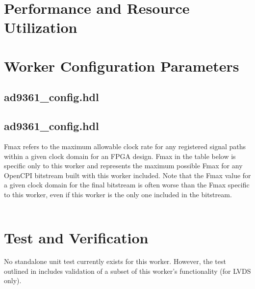 \documentclass{article}
\def\comp{ad9361\_config}
\edef\ecomp{ad9361_config}
\begin{document}
\begin{landscape}
\section{Performance and Resource Utilization}
\section{Worker Configuration Parameters}
\subsection{\comp.hdl}
%
\subsection{\comp.hdl}
Fmax refers to the maximum allowable clock rate for any registered signal paths within a given clock domain for an FPGA design. Fmax in the table below is specific only to this worker and represents the maximum possible Fmax for any OpenCPI bitstream built with this worker included. Note that the Fmax value for a given clock domain for the final bitstream is often worse than the Fmax specific to this worker, even if this worker is the only one included in the bitstream. \\ \\

%


\end{landscape}


\section{Test and Verification}
No standalone unit test currently exists for this worker. However, the test outlined in \cite{dac_comp_datasheet} includes validation of a subset of this worker's functionality (for LVDS only).
\end{document}
